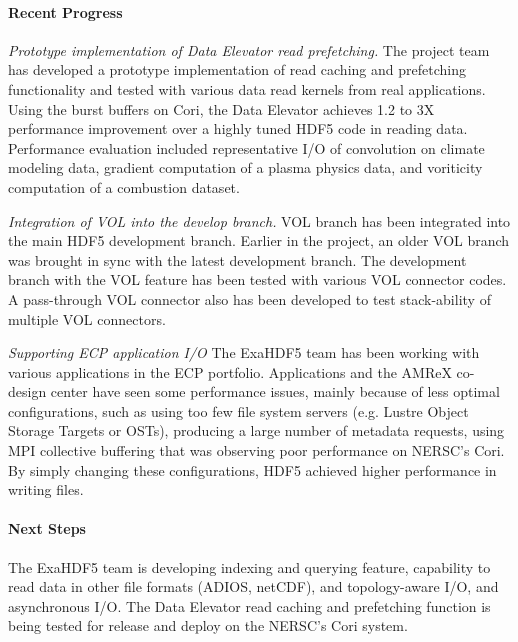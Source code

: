 \paragraph{Recent Progress}
\emph{Prototype implementation of Data Elevator read prefetching.} The project team has developed a prototype implementation of read caching and prefetching functionality and tested with various data read kernels from real applications. Using the burst buffers on Cori, the Data Elevator achieves 1.2 to 3X performance improvement over a highly tuned HDF5 code in reading data. Performance evaluation included representative I/O of convolution on climate modeling data, gradient computation of a plasma physics data, and voriticity computation of a combustion dataset. 

\emph{Integration of VOL into the develop branch. } VOL branch has been integrated into the main HDF5 development branch. Earlier in the project, an older VOL branch was brought in sync with the latest development branch. The development branch with the VOL feature has been tested with various VOL connector codes. A pass-through VOL connector also has been developed to test stack-ability of multiple VOL connectors. 

\emph{Supporting ECP application I/O}
The ExaHDF5 team has been working with various applications in the ECP portfolio. Applications and the AMReX co-design center have seen some performance issues, mainly because of less optimal configurations, such as using too few file system servers (e.g. Lustre Object Storage Targets or OSTs), producing a large number of metadata requests, using MPI collective buffering that was observing poor performance on NERSC's Cori. By simply changing these configurations, HDF5 achieved higher performance in writing files. 

\paragraph{Next Steps}

The ExaHDF5 team is developing indexing and querying feature, capability to read data in other file formats (ADIOS, netCDF), and topology-aware I/O, and asynchronous I/O. The Data Elevator read caching and prefetching function is being tested for release and deploy on the NERSC's Cori system. 

